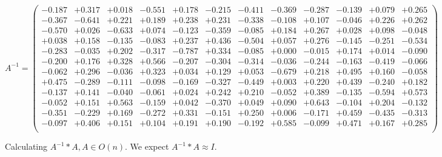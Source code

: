 \documentclass[9pt]{article}
\theoremstyle{plain}
\theoremstyle{definition}
\theoremstyle{remark}
\numberwithin{equation}{section}
\begin{document}
$A^{-1} = \left(
\begin{array}{
cccccccccccc}
-0.187 & +0.317 & +0.018 & -0.551 & +0.178 & -0.215 & -0.411 & -0.369 & -0.287 & -0.139 & +0.079 & +0.265 \\
-0.367 & -0.641 & +0.221 & +0.189 & +0.238 & +0.231 & -0.338 & -0.108 & +0.107 & -0.046 & +0.226 & +0.262 \\
-0.570 & +0.026 & -0.633 & +0.074 & -0.123 & -0.359 & -0.085 & +0.184 & +0.267 & +0.028 & +0.098 & -0.048 \\
+0.038 & +0.158 & -0.135 & -0.083 & +0.237 & +0.436 & -0.504 & +0.057 & +0.276 & -0.145 & -0.251 & -0.534 \\
-0.283 & -0.035 & +0.202 & -0.317 & -0.787 & +0.334 & -0.085 & +0.000 & -0.015 & +0.174 & +0.014 & -0.090 \\
-0.200 & +0.176 & +0.328 & +0.566 & -0.207 & -0.304 & -0.314 & -0.036 & -0.244 & -0.163 & -0.419 & -0.066 \\
-0.062 & +0.296 & -0.036 & +0.323 & +0.034 & +0.129 & +0.053 & -0.679 & +0.218 & +0.495 & +0.160 & -0.058 \\
+0.475 & -0.289 & -0.111 & -0.098 & -0.169 & -0.327 & -0.449 & +0.003 & +0.220 & +0.439 & -0.240 & +0.182 \\
-0.137 & +0.141 & -0.040 & -0.061 & +0.024 & +0.242 & +0.210 & -0.052 & +0.389 & -0.135 & -0.594 & +0.573 \\
-0.052 & +0.151 & +0.563 & -0.159 & +0.042 & -0.370 & +0.049 & +0.090 & +0.643 & -0.104 & +0.204 & -0.132 \\
-0.351 & -0.229 & +0.169 & -0.272 & +0.331 & -0.151 & +0.250 & +0.006 & -0.171 & +0.459 & -0.435 & -0.313 \\
-0.097 & +0.406 & +0.151 & +0.104 & +0.191 & +0.190 & -0.192 & +0.585 & -0.099 & +0.471 & +0.167 & +0.285 \\
\end{array}
\right)$ \newline 

Calculating $A^{-1} *A  ,  A \in O(n)$.   We expect $A^{-1} *A  \approx I$. 
\end{document}
